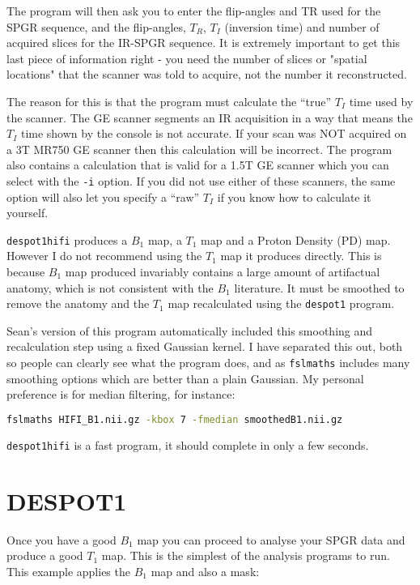 \documentclass{report}
\begin{document}
The program will then ask you to enter the flip-angles and TR used for the SPGR sequence, and the flip-angles, $T_R$, $T_I$ (inversion time) and number of acquired slices for the IR-SPGR sequence. It is extremely important to get this last piece of information right - you need the number of slices or "spatial locations" that the scanner was told to acquire, not the number it reconstructed.

The reason for this is that the program must calculate the ``true'' $T_I$ time used by the scanner. The GE scanner segments an IR acquisition in a way that means the $T_I$ time shown by the console is not accurate. If your scan was NOT acquired on a 3T MR750 GE scanner then this calculation will be incorrect. The program also contains a calculation that is valid for a 1.5T GE scanner which you can select with the \texttt{-i} option. If you did not use either of these scanners, the same option will also let you specify a ``raw'' $T_I$ if you know how to calculate it yourself.

\texttt{despot1hifi} produces a $B_1$ map, a $T_1$ map and a Proton Density (PD) map. However I do not recommend using the $T_1$ map it produces directly. This is because $B_1$ map produced invariably contains a large amount of artifactual anatomy, which is not consistent with the $B_1$ literature. It must be smoothed to remove the anatomy and the $T_1$ map recalculated using the \texttt{despot1} program.

Sean's version of this program automatically included this smoothing and recalculation step using a fixed Gaussian kernel. I have separated this out, both so people can clearly see what the program does, and as \texttt{fslmaths} includes many smoothing options which are better than a plain Gaussian. My personal preference is for median filtering, for instance:

\begin{lstlisting}[language=sh]
fslmaths HIFI_B1.nii.gz -kbox 7 -fmedian smoothedB1.nii.gz
\end{lstlisting}

\texttt{despot1hifi} is a fast program, it should complete in only a few seconds.

\section{DESPOT1}

Once you have a good $B_1$ map you can proceed to analyse your SPGR data and produce a good $T_1$ map. This is the simplest of the analysis programs to run. This example applies the $B_1$ map and also a mask:
\end{document}

